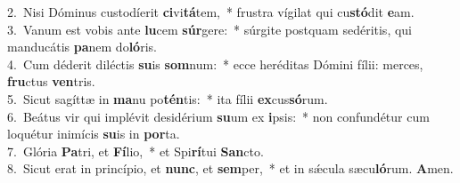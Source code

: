 {2.~}Nisi Dóminus custodíerit \textbf{ci}vi\textbf{tá}tem,~* frustra vígilat qui cu\textbf{stó}dit \textbf{e}am.\\
{3.~}Vanum est vobis ante \textbf{lu}cem \textbf{súr}gere:~* súrgite postquam sedéritis, qui manducátis \textbf{pa}nem do\textbf{ló}ris.\\
{4.~}Cum déderit diléctis \textbf{su}is \textbf{som}num:~* ecce heréditas Dómini fílii: merces, \textbf{fru}ctus \textbf{ven}tris.\\
{5.~}Sicut sagíttæ in \textbf{ma}nu po\textbf{tén}tis:~* ita fílii \textbf{ex}cus\textbf{só}rum.\\
{6.~}Beátus vir qui implévit desidérium \textbf{su}um ex \textbf{i}psis:~* non confundétur cum loquétur inimícis \textbf{su}is in \textbf{por}ta.\\
{7.~}Glória \textbf{Pa}tri, et \textbf{Fí}lio,~* et Spi\textbf{rí}tui \textbf{San}cto.\\
{8.~}Sicut erat in princípio, et \textbf{nunc}, et \textbf{sem}per,~* et in sǽcula sæcu\textbf{ló}rum. \textbf{A}men.\\
